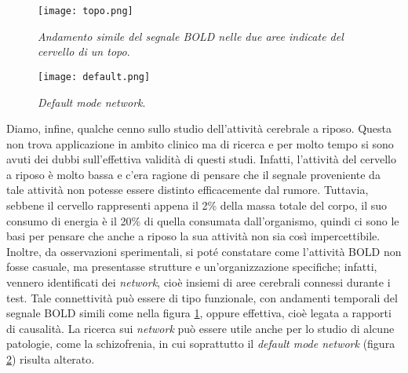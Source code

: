 \documentclass{report}
\newcommand{\figref}[1]{figura \ref{#1}}
\numberwithin{equation}{section}
\numberwithin{figure}{section}
\begin{document}
\begin{figure}[htp]
\centering
\texttt{[image: topo.png]}
\caption{\label{fig:topo} \textit{Andamento simile del segnale BOLD nelle due aree indicate del cervello di un topo}.}
\end{figure}

\begin{figure}[htp]
\centering
\texttt{[image: default.png]}
\caption{\label{fig:default} \textit{Default mode network}.}
\end{figure}

Diamo, infine, qualche cenno sullo studio dell'attività cerebrale a riposo. Questa non trova applicazione in ambito clinico ma di ricerca e per molto tempo si sono avuti dei dubbi sull'effettiva validità di questi studi. Infatti, l'attività del cervello a riposo è molto bassa e c'era ragione di pensare che il segnale proveniente da tale attività non potesse essere distinto efficacemente dal rumore. Tuttavia, sebbene il cervello rappresenti appena il 2\% della massa totale del corpo, il suo consumo di energia è il 20\% di quella consumata dall'organismo, quindi ci sono le basi per pensare che anche a riposo la sua attività non sia così impercettibile. Inoltre, da osservazioni sperimentali, si poté constatare come l'attività BOLD non fosse casuale, ma presentasse strutture e un'organizzazione specifiche; infatti, vennero identificati dei \textit{network}, cioè insiemi di aree cerebrali connessi durante i test. Tale connettività può essere di tipo funzionale, con andamenti temporali del segnale BOLD simili come nella \figref{fig:topo}, oppure effettiva, cioè legata a rapporti di causalità. La ricerca sui \textit{network} può essere utile anche per lo studio di alcune patologie, come la schizofrenia, in cui soprattutto il \textit{default mode network} (\figref{fig:default}) risulta alterato.
\end{document}
